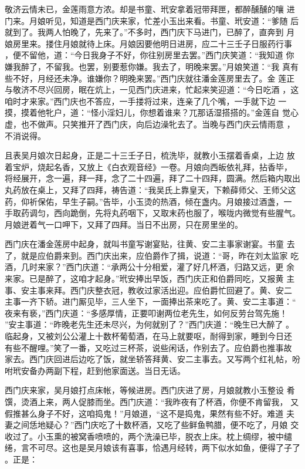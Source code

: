 敬济云情未已，金莲雨意方浓。却是书童、玳安拿着冠带拜匣，都醉醺醺的嚷
进门来。月娘听见，知道是西门庆来家，忙差小玉出来看。书童、玳安道：“爹随
后就到了。我两人怕晚了，先来了。”不多时，西门庆下马进门，已醉了，直奔到
月娘房里来。搂住月娘就待上床。月娘因要他明日进房，应二十三壬子日服药行事
，便不留他，道：“今日我身子不好，你往别房里去罢。”西门庆笑道：“我知道
你嫌我醉了，不留我。也罢，别要惹你嫌。我去了，明晚来罢。”月娘笑道：“我
真有些不好，月经还未净。谁嫌你？明晚来罢。”西门庆就往潘金莲房里去了。金
莲正与敬济不尽兴回房，眠在炕上，一见西门庆进来，忙起来笑迎道：“今日吃酒
，这咱时才来家。”西门庆也不答应，一手搂将过来，连亲了几个嘴，一手就下边
一摸，摸着他牝户，道：“怪小淫妇儿，你想着谁来？兀那话湿搭搭的。”金莲自
觉心虚，也不做声。只笑推开了西门庆，向后边澡牝去了。当晚与西门庆云情雨意
，不消说得。

且表吴月娘次日起身，正是二十三壬子日，梳洗毕，就教小玉摆着香桌，上边
放着宝炉，烧起名香，又放上《白衣观音经》一卷。月娘向西皈依礼拜，拈香毕，
将经展开，念一遍，拜一拜，念了二十四遍，拜了二十四拜，圆满。然后箱内取出
丸药放在桌上，又拜了四拜，祷告道：“我吴氏上靠皇天，下赖薛师父、王师父这
药，仰祈保佑，早生子嗣。”告毕，小玉烫的热酒，倾在盏内。月娘接过酒盏，一
手取药调匀，西向跪倒，先将丸药咽下，又取末药也服了，喉咙内微觉有些腥气。
月娘迸着气一口呷下，又拜了四拜。当日不出房，只在房里坐的。

西门庆在潘金莲房中起身，就叫书童写谢宴贴，往黄、安二主事家谢宴。书童
去了，就是应伯爵来到。西门庆出来，应伯爵作了揖，说道：“哥，昨在刘太监家
吃酒，几时来家？”西门庆道：“承两公十分相爱，灌了好几杯酒，归路又远，更
余来家。已是醉了，这咱才起身。”玳安捧出早饭，西门庆正和伯爵同吃，又报黄
主事、安主事来拜。西门庆整衣冠，教收过家活出迎。应伯爵忙回避了。黄、安二
主事一齐下轿。进门厮见毕，三人坐下，一面捧出茶来吃了。黄、安二主事道：“
夜来有亵，”西门庆道：“多感厚情，正要叩谢两位老先生，如何反劳台驾先施！
”安主事道：“昨晚老先生还未尽兴，为何就别了？”西门庆道：“晚生已大醉了
。临起身，又被刘公公灌上十数杯葡萄酒，在马上就要呕，耐得到家，睡到今日还
有些不醒哩。”笑了一番，又吃过三杯茶，说些闲话，作别去了。应伯爵也推事故
家去。西门庆回进后边吃了饭，就坐轿答拜黄、安二主事去。又写两个红礼帖，吩
咐玳安备办两副下程，赶到他家面送。当日无话。

西门庆来家，吴月娘打点床帐，等候进房。西门庆进了房，月娘就教小玉整设
肴馔，烫酒上来，两人促膝而坐。西门庆道：“我昨夜有了杯酒，你便不肯留我，
又假推甚么身子不好，这咱捣鬼！”月娘道，“这不是捣鬼，果然有些不好。难道
夫妻之间恁地疑心？”西门庆吃了十数杯酒，又吃了些鲜鱼鸭腊，便不吃了，月娘
交收过了。小玉熏的被窝香喷喷的，两个洗澡已毕，脱衣上床。枕上绸缪，被中缱
绻，言不可尽。这也是吴月娘该有喜事，恰遇月经转，两下似水如鱼，便得了子了
。正是：


